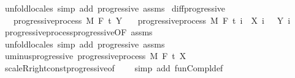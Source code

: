 \begin{isabellebody}
\ {\isacharparenleft}{\kern0pt}unfold{\isacharunderscore}{\kern0pt}locales{\isacharparenright}{\kern0pt}\ {\isacharparenleft}{\kern0pt}simp\ add{\isacharcolon}{\kern0pt}\ progressive\ assms{\isacharparenright}{\kern0pt}%
\endisatagproof
{\isafoldproof}%
%
\isadelimproof
\isanewline
%
\endisadelimproof
\isanewline
{}\isamarkupfalse%
\ diff{\isacharunderscore}{\kern0pt}progressive{\isacharcolon}{\kern0pt}\isanewline
\ \ \ {\isachardoublequoteopen}progressive{\isacharunderscore}{\kern0pt}process\ M\ F\ t\ Y{\isachardoublequoteclose}\isanewline
\ \ \ {\isachardoublequoteopen}progressive{\isacharunderscore}{\kern0pt}process\ M\ F\ t\ {\isacharparenleft}{\kern0pt}{\isasymlambda}i\ {\isasymxi}{\isachardot}{\kern0pt}\ X\ i\ {\isasymxi}\ {\isacharminus}{\kern0pt}\ Y\ i\ {\isasymxi}{\isacharparenright}{\kern0pt}{\isachardoublequoteclose}\isanewline
%
\isadelimproof
\ \ %
\endisadelimproof
%
\isatagproof
{}\isamarkupfalse%
\ progressive{\isacharunderscore}{\kern0pt}process{\isachardot}{\kern0pt}progressive{\isacharbrackleft}{\kern0pt}OF\ assms{\isacharbrackright}{\kern0pt}\ \isamarkupfalse%
\ {\isacharparenleft}{\kern0pt}unfold{\isacharunderscore}{\kern0pt}locales{\isacharparenright}{\kern0pt}\ {\isacharparenleft}{\kern0pt}simp\ add{\isacharcolon}{\kern0pt}\ progressive\ assms{\isacharparenright}{\kern0pt}%
\endisatagproof
{\isafoldproof}%
%
\isadelimproof
\isanewline
%
\endisadelimproof
\isanewline
{}\isamarkupfalse%
\ uminus{\isacharunderscore}{\kern0pt}progressive{\isacharcolon}{\kern0pt}\ {\isachardoublequoteopen}progressive{\isacharunderscore}{\kern0pt}process\ M\ F\ t\ {\isacharparenleft}{\kern0pt}{\isacharminus}{\kern0pt}X{\isacharparenright}{\kern0pt}{\isachardoublequoteclose}%
\isadelimproof
\ %
\endisadelimproof
%
\isatagproof
{}\isamarkupfalse%
\ scaleR{\isacharunderscore}{\kern0pt}right{\isacharunderscore}{\kern0pt}const{\isacharunderscore}{\kern0pt}progressive{\isacharbrackleft}{\kern0pt}of\ {\isachardoublequoteopen}{\isasymlambda}{\isacharunderscore}{\kern0pt}{\isachardot}{\kern0pt}\ {\isacharminus}{\kern0pt}{}{\isachardoublequoteclose}{\isacharbrackright}{\kern0pt}\ \isamarkupfalse%
\ {\isacharparenleft}{\kern0pt}simp\ add{\isacharcolon}{\kern0pt}\ fun{\isacharunderscore}{\kern0pt}Compl{\isacharunderscore}{\kern0pt}def{\isacharparenright}{\kern0pt}%
\endisatagproof
{\isafoldproof}%
%
\isadelimproof
%
\endisadelimproof
\isanewline
\isanewline

\end{isabellebody}
